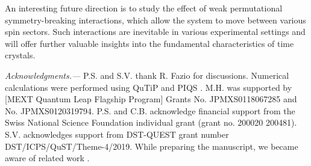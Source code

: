 \documentclass[pra,aps,twocolumn,superscriptaddress,notitlepage]{revtex4-1}
\begin{document}
	An interesting future direction is to study the effect of weak permutational symmetry-breaking interactions, which allow the system to move between various spin sectors. 
	Such interactions are inevitable in various experimental settings and will offer further valuable insights into the fundamental characteristics of time crystals.
	
	
	\begin{acknowledgments}
		\noindent \textit{Acknowledgments.---} P.S. and S.V. thank R. Fazio for discussions.  Numerical calculations were performed using QuTiP \cite{johansson2012qutip,johansson2013qutip2} and PIQS \cite{shammah2018piqs}. M.H. was supported by [MEXT Quantum Leap Flagship Program] Grants No. JPMXS0118067285 and No. JPMXS0120319794. P.S. and C.B. acknowledge financial support from the Swiss National Science Foundation individual grant (grant no. 200020 200481). S.V. acknowledges support from DST-QUEST grant number DST/ICPS/QuST/Theme-4/2019.  While preparing the manuscript, we became aware of related work \cite{iemini2023dynamics}. 
	\end{acknowledgments}
	
\end{document}
